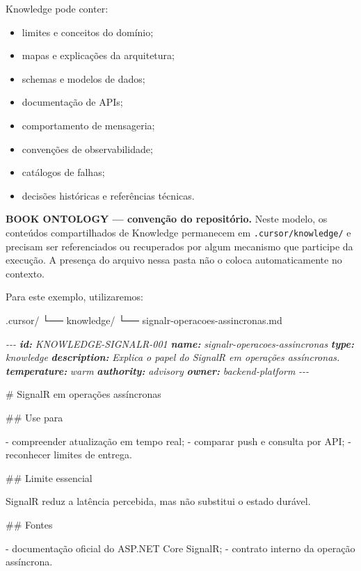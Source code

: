 \documentclass[
  10pt,
  a4paper,
  oneside]{book}
\newenvironment{Shaded}{}{}
\newcommand{\AnnotationTok}[1]{\textcolor[rgb]{0.38,0.63,0.69}{\textbf{\textit{#1}}}}
\newcommand{\CommentTok}[1]{\textcolor[rgb]{0.38,0.63,0.69}{\textit{#1}}}
\newcommand{\FunctionTok}[1]{\textcolor[rgb]{0.02,0.16,0.49}{#1}}
\newcommand{\NormalTok}[1]{#1}
\newcommand{\SpecialStringTok}[1]{\textcolor[rgb]{0.73,0.40,0.53}{#1}}
\providecommand{\tightlist}{%
  \setlength{\itemsep}{0pt}\setlength{\parskip}{0pt}}
\renewenvironment{Shaded}{\begin{snugshade}}{\end{snugshade}}%
\begin{document}
Knowledge pode conter:

\begin{itemize}
\tightlist
\item
  limites e conceitos do domínio;
\item
  mapas e explicações da arquitetura;
\item
  schemas e modelos de dados;
\item
  documentação de APIs;
\item
  comportamento de mensageria;
\item
  convenções de observabilidade;
\item
  catálogos de falhas;
\item
  decisões históricas e referências técnicas.
\end{itemize}

\textbf{BOOK ONTOLOGY --- convenção do repositório.} Neste modelo, os
conteúdos compartilhados de Knowledge permanecem em
\texttt{.cursor/knowledge/} e precisam ser referenciados ou recuperados
por algum mecanismo que participe da execução. A presença do arquivo
nessa pasta não o coloca automaticamente no contexto.

Para este exemplo, utilizaremos:

\begin{Shaded}
\begin{Highlighting}[]
\NormalTok{.cursor/}
\NormalTok{└── knowledge/}
\NormalTok{    └── signalr{-}operacoes{-}assincronas.md}
\end{Highlighting}
\end{Shaded}

\begin{Shaded}
\begin{Highlighting}[]
\CommentTok{{-}{-}{-}}
\AnnotationTok{id:}\CommentTok{ KNOWLEDGE{-}SIGNALR{-}001}
\AnnotationTok{name:}\CommentTok{ signalr{-}operacoes{-}assincronas}
\AnnotationTok{type:}\CommentTok{ knowledge}
\AnnotationTok{description:}\CommentTok{ Explica o papel do SignalR em operações assíncronas.}
\AnnotationTok{temperature:}\CommentTok{ warm}
\AnnotationTok{authority:}\CommentTok{ advisory}
\AnnotationTok{owner:}\CommentTok{ backend{-}platform}
\CommentTok{{-}{-}{-}}

\FunctionTok{\# SignalR em operações assíncronas}

\FunctionTok{\#\# Use para}

\SpecialStringTok{{-} }\NormalTok{compreender atualização em tempo real;}
\SpecialStringTok{{-} }\NormalTok{comparar push e consulta por API;}
\SpecialStringTok{{-} }\NormalTok{reconhecer limites de entrega.}

\FunctionTok{\#\# Limite essencial}

\NormalTok{SignalR reduz a latência percebida, mas não substitui o estado durável.}

\FunctionTok{\#\# Fontes}

\SpecialStringTok{{-} }\NormalTok{documentação oficial do ASP.NET Core SignalR;}
\SpecialStringTok{{-} }\NormalTok{contrato interno da operação assíncrona.}
\end{Highlighting}
\end{Shaded}
\end{document}
